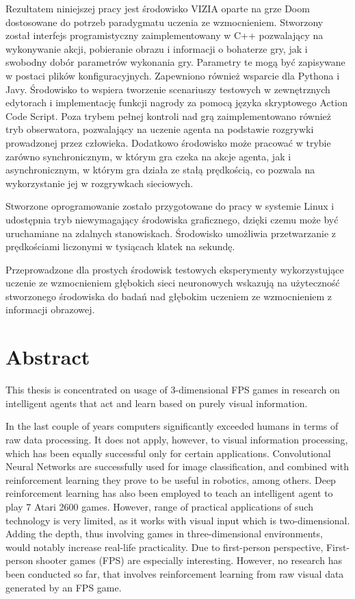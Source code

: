 \documentclass[english,bachelor,a4paper,twoside]{ppfcmthesis}
\begin{document}
Rezultatem niniejszej pracy jest środowisko VIZIA oparte na grze Doom dostosowane do potrzeb paradygmatu uczenia ze wzmocnieniem.
Stworzony został interfejs programistyczny zaimplementowany w C++ pozwalający na wykonywanie akcji, pobieranie obrazu i informacji o bohaterze gry, jak i swobodny dobór parametrów wykonania gry.
Parametry te mogą być zapisywane w postaci plików konfiguracyjnych.
Zapewniono również wsparcie dla Pythona i Javy.
Środowisko to wspiera tworzenie scenariuszy testowych w zewnętrznych edytorach i implementację funkcji nagrody za pomocą języka skryptowego Action Code Script.
Poza trybem pełnej kontroli nad grą zaimplementowano również tryb obserwatora, pozwalający na uczenie agenta na podstawie rozgrywki prowadzonej przez człowieka.
Dodatkowo środowisko może pracować w trybie zarówno synchronicznym, w którym gra czeka na akcje agenta, jak i asynchronicznym, w którym gra działa ze stałą prędkością, co pozwala na wykorzystanie jej w rozgrywkach sieciowych.

Stworzone oprogramowanie zostało przygotowane do pracy w systemie Linux i udostępnia tryb niewymagający środowiska graficznego, dzięki czemu może być uruchamiane na zdalnych stanowiskach.
Środowisko umożliwia przetwarzanie z prędkościami liczonymi w tysiącach klatek na sekundę.

Przeprowadzone dla prostych środowisk testowych eksperymenty wykorzystujące uczenie ze wzmocnieniem głębokich sieci neuronowych wskazują na użyteczność stworzonego środowiska do badań nad głębokim uczeniem ze wzmocnieniem z informacji obrazowej.
	
\chapter*{Abstract}

This thesis is concentrated on usage of 3-dimensional FPS games in research on intelligent agents that act and learn based on purely visual information.


In the last couple of years computers significantly exceeded humans in terms of raw data processing.
It does not apply, however, to visual information processing, which has been equally successful only for certain applications.
Convolutional Neural Networks are successfully used for image classification, and combined with reinforcement learning they prove to be useful in robotics, among others.
Deep reinforcement learning has also been employed to teach an intelligent agent to play 7 Atari 2600 games.
However, range of practical applications of such technology is very limited, as it works with visual input which is two-dimensional.
Adding the depth, thus involving games in three-dimensional environments, would notably increase real-life practicality.
Due to first-person perspective, First-person shooter games (FPS) are especially interesting. However, no research has been conducted so far, that involves reinforcement learning from raw visual data generated by an FPS game.
\end{document}
